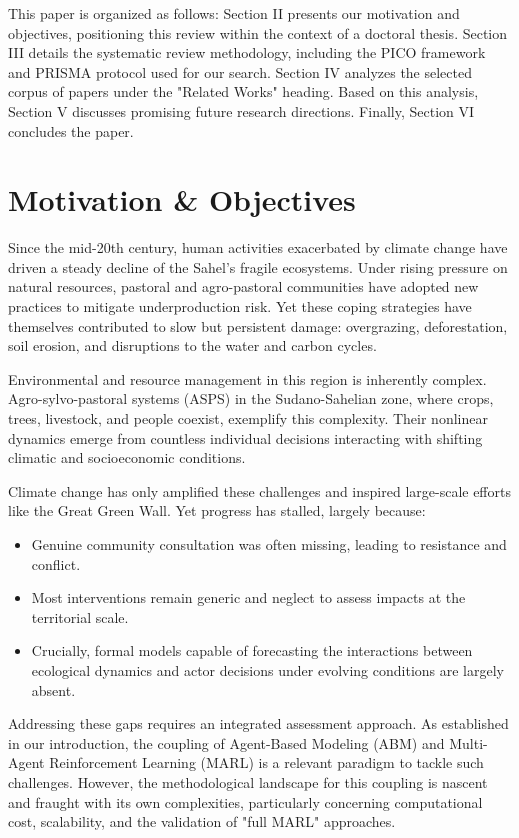 \documentclass[conference]{IEEEtran}
\begin{document}
This paper is organized as follows: Section II presents our motivation and objectives, positioning this review within the context of a doctoral thesis. Section III details the systematic review methodology, including the PICO framework and PRISMA protocol used for our search. Section IV analyzes the selected corpus of papers under the "Related Works" heading. Based on this analysis, Section V discusses promising future research directions. Finally, Section VI concludes the paper.

\section{Motivation \& Objectives}

Since the mid-20th century, human activities exacerbated by climate change have driven a steady decline of the Sahel’s fragile ecosystems. Under rising pressure on natural resources, pastoral and agro-pastoral communities have adopted new practices to mitigate underproduction risk. Yet these coping strategies have themselves contributed to slow but persistent damage: overgrazing, deforestation, soil erosion, and disruptions to the water and carbon cycles.

Environmental and resource management in this region is inherently complex. Agro-sylvo-pastoral systems (ASPS) in the Sudano-Sahelian zone, where crops, trees, livestock, and people coexist, exemplify this complexity. Their nonlinear dynamics emerge from countless individual decisions interacting with shifting climatic and socioeconomic conditions.

Climate change has only amplified these challenges and inspired large-scale efforts like the Great Green Wall. Yet progress has stalled, largely because:
\begin{itemize}
    \item Genuine community consultation was often missing, leading to resistance and conflict.
    \item Most interventions remain generic and neglect to assess impacts at the territorial scale.
    \item Crucially, formal models capable of forecasting the interactions between ecological dynamics and actor decisions under evolving conditions are largely absent.
\end{itemize}

Addressing these gaps requires an integrated assessment approach. As established in our introduction, the coupling of Agent-Based Modeling (ABM) and Multi-Agent Reinforcement Learning (MARL) is a relevant paradigm to tackle such challenges. However, the methodological landscape for this coupling is nascent and fraught with its own complexities, particularly concerning computational cost, scalability, and the validation of "full MARL" approaches.
\end{document}
